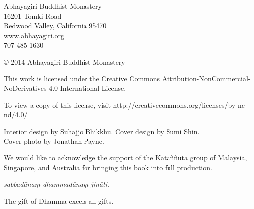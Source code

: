 \thispagestyle{empty}
{\footnotesize\raggedright
{}

\vspace{1em}
Abhayagiri Buddhist Monastery\\
16201 Tomki Road\\
Redwood Valley, California 95470\\
www.abhayagiri.org\\
707-485-1630

\vspace{1em}
\copyright{} 2014 Abhayagiri Buddhist Monastery

\vspace{1em}
This work is licensed under the Creative Commons
Attribution-NonCommercial-NoDerivatives 4.0 International License.

To view a copy of this license, visit
http://creativecommons.org/licenses/by-nc-nd/4.0/

\vspace{1em}

Interior design by Suhajjo Bhikkhu. Cover design by Sumi Shin.\\
Cover photo by Jonathan Payne. 


\vspace{1em}

We would like to acknowledge the support of the Kataññutā group of
Malaysia, Singapore, and Australia for bringing this book into full
production.

\vspace{1em}

\textit{sabbadānaṃ dhammadānaṃ jināti.}

The gift of Dhamma excels all gifts.
}

\clearpage
